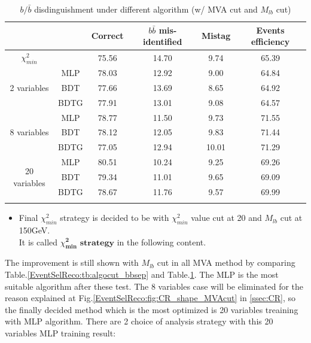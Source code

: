 		\begin{center}
		\begin{longtable}[H]{ c c | c c c | c }
		\caption{$b/\bar{b}$ disdinguishment under different algorithm (w/ MVA cut and $M_{lb}$ cut)}\\
		\hline
		[\%] & & Correct & $b\bar{b}$ mis-identified & Mistag & Events efficiency  \\ 
		\hline
		$\chi^2_{min}$ & & 75.56 & 14.70 & 9.74 & 65.39 \\
		\hline
		\multirow{3}{5em}{2 variables} & MLP & 78.03 & 12.92 & 9.00 & 64.84  \\
		& BDT & 77.66 & 13.69 & 8.65 & 64.92 \\
		& BDTG & 77.91 & 13.01 & 9.08 & 64.57  \\
		\hline
		\multirow{3}{5em}{8 variables} & MLP & 78.77 & 11.50 & 9.73 & 71.55 \\
		& BDT & 78.12 & 12.05 & 9.83 & 71.44 \\
		& BDTG & 77.05 & 12.94 & 10.01 & 71.29 \\
		\hline
		\multirow{3}{5em}{20 variables} & MLP & 80.51 & 10.24 & 9.25 & 69.26 \\
		& BDT & 79.34 & 11.01 & 9.65 & 69.09 \\
		& BDTG & 78.67 & 11.76 & 9.57 & 69.99 \\
		\hline{}
		\label{EventSelReco:tb:algocut_mlbcut_bbsep}
		\end{longtable}
		\end{center}
		\FloatBarrier

		\begin{itemize}
			\item Final $\chi^2_{min}$ strategy is decided to be with $\chi^2_{min}$ value cut at 20 and $M_{lb}$ cut at 150GeV.\\
			It is called $\chi^{\textbf{2}}_{\textbf{min}}$ $\textbf{strategy}$ in the following content.
		\end{itemize}
		The improvement is still shown with $M_{lb}$ cut in all MVA method by comparing Table.\ref{EventSelReco:tb:algocut_bbsep} and Table.\ref{EventSelReco:tb:algocut_mlbcut_bbsep}. The MLP is the most suitable algorithm after these test. The 8 variables case will be eliminated for the reason explained at Fig.\ref{EventSelReco:fig:CR_shape_MVAcut} in \ref{ssec:CR}, so the finally decided method which is the most optimized is 20 variables treaining with MLP algorithm. There are 2 choice of analysis strategy with this 20 variables MLP training result: 

